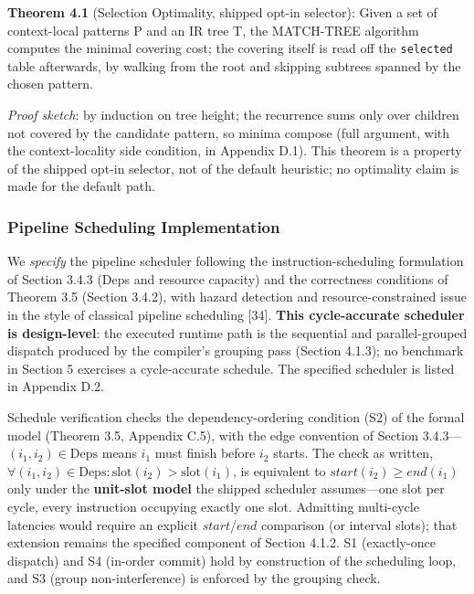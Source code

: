 \documentclass[
  sigconf,
  anonymous]{acmart}
\begin{document}
\textbf{Theorem 4.1} (Selection Optimality, shipped opt-in selector):
Given a set of context-local patterns P and an IR tree T, the MATCH-TREE
algorithm computes the minimal covering cost; the covering itself is
read off the \texttt{selected} table afterwards, by walking from the
root and skipping subtrees spanned by the chosen pattern.

\emph{Proof sketch}: by induction on tree height; the recurrence sums
only over children not covered by the candidate pattern, so minima
compose (full argument, with the context-locality side condition, in
Appendix D.1). This theorem is a property of the shipped opt-in
selector, not of the default heuristic; no optimality claim is made for
the default path.

\subsubsection{Pipeline Scheduling
Implementation}\label{pipeline-scheduling-implementation}

We \emph{specify} the pipeline scheduler following the
instruction-scheduling formulation of Section 3.4.3 (Deps and resource
capacity) and the correctness conditions of Theorem 3.5 (Section 3.4.2),
with hazard detection and resource-constrained issue in the style of
classical pipeline scheduling {[}34{]}. \textbf{This cycle-accurate
scheduler is design-level}: the executed runtime path is the sequential
and parallel-grouped dispatch produced by the compiler's grouping pass
(Section 4.1.3); no benchmark in Section 5 exercises a cycle-accurate
schedule. The specified scheduler is listed in Appendix D.2.

Schedule verification checks the dependency-ordering condition (S2) of
the formal model (Theorem 3.5, Appendix C.5), with the edge convention
of Section 3.4.3---\((i_1, i_2) \in \text{Deps}\) means \(i_1\) must
finish before \(i_2\) starts. The check as written,
\(\forall (i_1, i_2) \in \text{Deps}: \text{slot}(i_2) > \text{slot}(i_1)\),
is equivalent to \(start(i_2) \geq end(i_1)\) only under the
\textbf{unit-slot model} the shipped scheduler assumes---one slot per
cycle, every instruction occupying exactly one slot. Admitting
multi-cycle latencies would require an explicit \(start\)/\(end\)
comparison (or interval slots); that extension remains the specified
component of Section 4.1.2. S1 (exactly-once dispatch) and S4 (in-order
commit) hold by construction of the scheduling loop, and S3 (group
non-interference) is enforced by the grouping check.
\end{document}
